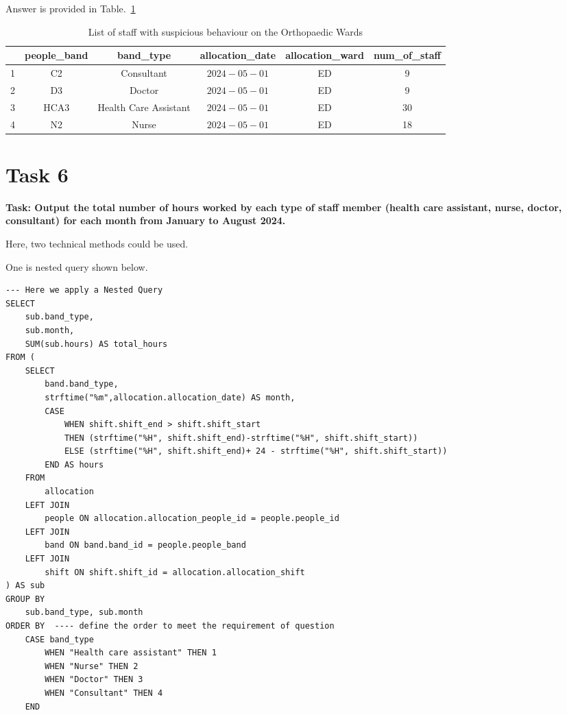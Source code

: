 \documentclass{article}
\begin{document}
Answer is provided in Table.~\ref{tab:task5}

\begin{table}[h]
    \centering
\begin{tabular}{|c|c|c|c|c|c|}
\hline & people\_band & \multicolumn{1}{|c|}{ band\_type } & allocation\_date & allocation\_ward & num\_of\_staff \\
\hline 1 & C2 & Consultant & $2024-05-01$ & ED & 9 \\
\hline 2 & D3 & Doctor & $2024-05-01$ & ED & 9 \\
\hline 3 & HCA3 & Health Care Assistant & $2024-05-01$ & ED & 30 \\
\hline 4 & N2 & Nurse & $2024-05-01$ & ED & 18 \\
\hline
\end{tabular}
   \caption{List of staff with suspicious behaviour on the Orthopaedic Wards}
    \label{tab:task5}
\end{table}

\section{Task 6}

\textbf{Task: Output the total number of hours worked by each type of staff member (health care assistant, nurse, doctor, consultant) for each month from January to August 2024.}

Here, two technical methods could be used. 

One is nested query shown below.

\begin{lstlisting}[style=sqlstyle]
--- Here we apply a Nested Query
SELECT
    sub.band_type,
    sub.month,
    SUM(sub.hours) AS total_hours
FROM (
    SELECT
        band.band_type,
        strftime("%m",allocation.allocation_date) AS month,
        CASE
            WHEN shift.shift_end > shift.shift_start  
            THEN (strftime("%H", shift.shift_end)-strftime("%H", shift.shift_start))
            ELSE (strftime("%H", shift.shift_end)+ 24 - strftime("%H", shift.shift_start))
        END AS hours
    FROM
        allocation
    LEFT JOIN
        people ON allocation.allocation_people_id = people.people_id
    LEFT JOIN
        band ON band.band_id = people.people_band
    LEFT JOIN
        shift ON shift.shift_id = allocation.allocation_shift
) AS sub
GROUP BY
    sub.band_type, sub.month
ORDER BY  ---- define the order to meet the requirement of question
    CASE band_type 
        WHEN "Health care assistant" THEN 1
        WHEN "Nurse" THEN 2
        WHEN "Doctor" THEN 3
        WHEN "Consultant" THEN 4
    END
\end{lstlisting}
\end{document}
